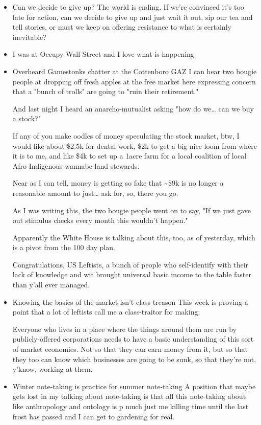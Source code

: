 \documentclass[11pt]{article}
\begin{document}
\begin{itemize}
\item Can we decide to give up?
\label{sec:org08d08f6}
The world is ending. If we're convinced it's too late for action, can we decide to give up and just wait it out, sip our tea and tell stories, or must we keep on offering resistance to what is certainly inevitable? 
\item I was at Occupy Wall Street and I love what is happening
\label{sec:org30af8bb}
\item Overheard Gamestonks chatter at the Cottenboro GAZ
\label{sec:org02269bb}
I can hear two bougie people at dropping off fresh apples at the free market here expressing concern that a "bunch of trolls" are going to "ruin their retirement."

And last night I heard an anarcho-mutualist asking "how do we… can we buy a stock?"

If any of you make oodles of money speculating the stock market, btw, I would like about \$2.5k for dental work, \$2k to get a big nice loom from where it is to me, and like \$4k to set up a 1acre farm for a local coalition of local Afro-Indigenous wannabe-land stewards.

Near as I can tell, money is getting so fake that \textasciitilde{}\$9k is no longer a reasonable amount to just… ask for, so, there you go.

As I was writing this, the two bougie people went on to say, "If we just gave out stimulus checks every month this wouldn't happen."

Apparently the White House is talking about this, too, as of yesterday, which is a pivot from the 100 day plan.

Congratulations, US Leftists, a bunch of people who self-identify with their lack of knowledge and wit brought universal basic income to the table faster than y'all ever managed.
\item Knowing the basics of the market isn't class treason
\label{sec:org01af6b8}
This week is proving a point that a lot of leftists call me a class-traitor for making:

Everyone who lives in a place where the things around them are run by publicly-offered corporations needs to have a basic understanding of this sort of market economies. Not so that they can earn money from it, but so that they too can know which businesses are going to be sunk, so that they're not, y'know, working at them.
\item Winter note-taking is practice for summer note-taking
\label{sec:org88f1be2}
A position that maybe gets lost in my talking about note-taking is that all this note-taking about like anthropology and ontology is p much just me killing time until the last frost has passed and I can get to gardening for real.


\end{itemize}
\end{document}
